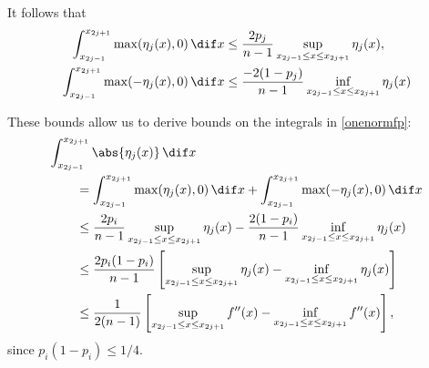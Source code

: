 \documentclass[]{elsarticle}
\theoremstyle{definition}
\theoremstyle{remark}
\begin{document}

It follows that
\begin{align*}
  \int_{x_{2j-1}}^{x_{2j+1}} \max(\eta_j(x),0) \, \dif x &\le \frac{2p_j}{n-1} \sup_{x_{2j-1} \le x \le x_{2j+1}} \eta_j(x),\\
  \int_{x_{2j-1}}^{x_{2j+1}} \max(-\eta_j(x),0) \, \dif x &\le \frac{-2(1-p_j)}{n-1} \inf_{x_{2j-1} \le x \le x_{2j+1}} \eta_j(x) 
\end{align*}

These bounds allow us to derive bounds on the integrals in \eqref{onenormfp}:
\begin{align*}
\MoveEqLeft{\int_{x_{2j-1}}^{x_{2j+1}} \abs{\eta_j(x)} \, \dif x} \\
 &= \int_{x_{2j-1}}^{x_{2j+1}} \max(\eta_j(x),0) \, \dif x + \int_{x_{2j-1}}^{x_{2j+1}} \max(-\eta_j(x),0) \, \dif x\\
&\le \frac{2p_i}{n-1} \sup_{x_{2j-1} \le x \le x_{2j+1}} \eta_j(x) - \frac{2(1-p_i)}{n-1} \inf_{x_{2j-1} \le x \le x_{2j+1}} \eta_j(x) \\
&\le \frac{2p_i(1-p_i)}{n-1} \left[ \sup_{x_{2j-1} \le x \le x_{2j+1}} \eta_j(x) - \inf_{x_{2j-1} \le x \le x_{2j+1}} \eta_j(x) \right]\\
&\le\frac{1}{2(n-1)} \left[ \sup_{x_{2j-1} \le x \le x_{2j+1}} f''(x) - \inf_{x_{2j-1} \le x \le x_{2j+1}} f''(x) \right],
\end{align*}
since $p_i(1-p_i)\le 1/4$.
\end{document}
